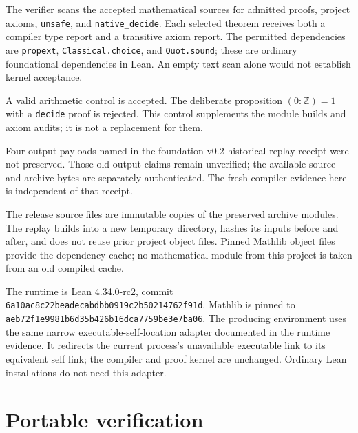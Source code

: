 \documentclass[11pt]{article}
\newcommand{\decl}[1]{\nolinkurl{#1}}
\begin{document}


The verifier scans the accepted mathematical sources for admitted proofs, project axioms, \decl{unsafe}, and \decl{native_decide}. Each selected theorem receives both a compiler type report and a transitive axiom report. The permitted dependencies are \decl{propext}, \decl{Classical.choice}, and \decl{Quot.sound}; these are ordinary foundational dependencies in Lean. An empty text scan alone would not establish kernel acceptance.

A valid arithmetic control is accepted. The deliberate proposition \((0:\mathbb Z)=1\) with a \decl{decide} proof is rejected. This control supplements the module builds and axiom audits; it is not a replacement for them.

Four output payloads named in the foundation v0.2 historical replay receipt were not preserved. Those old output claims remain unverified; the available source and archive bytes are separately authenticated. The fresh compiler evidence here is independent of that receipt.

The release source files are immutable copies of the preserved archive modules. The replay builds into a new temporary directory, hashes its inputs before and after, and does not reuse prior project object files. Pinned Mathlib object files provide the dependency cache; no mathematical module from this project is taken from an old compiled cache.

The runtime is Lean 4.34.0-rc2, commit
\decl{6a10ac8c22beadecabdbb0919c2b50214762f91d}. Mathlib is pinned to
\decl{aeb72f1e9981b6d35b426b16dca7759be3e7ba06}. The producing environment uses the same narrow executable-self-location adapter documented in the runtime evidence. It redirects the current process's unavailable executable link to its equivalent self link; the compiler and proof kernel are unchanged. Ordinary Lean installations do not need this adapter.

\section{Portable verification}
\end{document}
